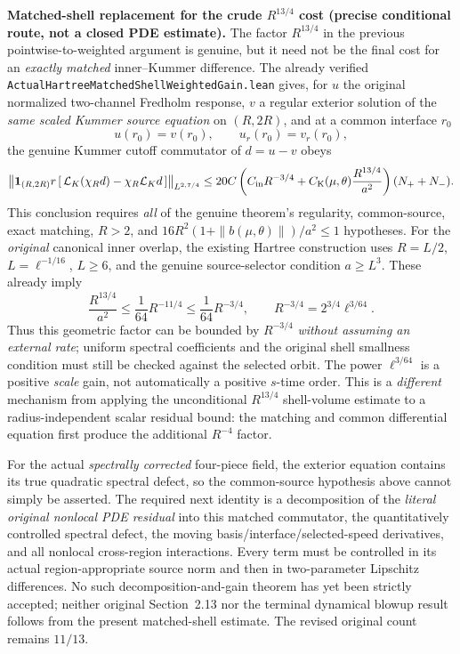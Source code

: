 \documentclass[11pt]{amsart}
\begin{document}
\medskip
\noindent\textbf{Matched-shell replacement for the crude $R^{13/4}$ cost
(precise conditional route, not a closed PDE estimate).}
The factor $R^{13/4}$ in the previous pointwise-to-weighted
argument is genuine, but it need not be the final cost for an
\emph{exactly matched} inner--Kummer difference.
The already verified
\texttt{ActualHartreeMatchedShellWeightedGain.lean} gives, for
$u$ the original normalized two-channel Fredholm response,
$v$ a regular exterior solution of the \emph{same scaled Kummer
source equation} on $(R,2R)$, and at a common interface $r_0$
\[
 u(r_0)=v(r_0),\qquad u_r(r_0)=v_r(r_0),
\]
the genuine Kummer cutoff commutator of $d=u-v$ obeys
\[
 \bigl\|\mathbf1_{(R,2R)}r\,
 [\,\mathcal L_K(\chi_Rd)-\chi_R\mathcal L_Kd\,]\bigr\|_{L^{2,7/4}}
 \le
 20C\left(C_{\rm in}R^{-3/4}
   +C_{\rm K}(\mu,\theta)\frac{R^{13/4}}{a^2}\right)
 (N_++N_-).
\]
This conclusion requires \emph{all} of the genuine theorem's
regularity, common-source, exact matching, $R>2$, and
$16R^2(1+\|b(\mu,\theta)\|)/a^2\le1$ hypotheses.
For the \emph{original} canonical inner overlap,
the existing Hartree construction uses
$R=L/2$, $L=\ell^{-1/16}$, $L\ge6$, and the genuine
source-selector condition $a\ge L^3$.
These already imply
\[
 \frac{R^{13/4}}{a^2}
 \le \frac1{64}R^{-11/4}
 \le \frac1{64}R^{-3/4},\qquad
 R^{-3/4}=2^{3/4}\ell^{3/64}.
\]
Thus this geometric factor can be bounded by
$R^{-3/4}$ \emph{without assuming an external rate};
uniform spectral coefficients and the original shell
smallness condition must still be checked against the selected orbit.
The power $\ell^{3/64}$ is a positive \emph{scale} gain,
not automatically a positive $s$-time order.
This is a \emph{different} mechanism from applying
the unconditional $R^{13/4}$ shell-volume estimate
to a radius-independent scalar residual bound:
the matching and common differential equation first
produce the additional $R^{-4}$ factor.

For the actual \emph{spectrally corrected} four-piece field,
the exterior equation contains its true quadratic spectral defect,
so the common-source hypothesis above cannot simply be asserted.
The required next identity is a decomposition of the \emph{literal
original nonlocal PDE residual} into this matched commutator,
the quantitatively controlled spectral defect, the moving
basis/interface/selected-speed derivatives, and all nonlocal
cross-region interactions. Every term must be controlled in its
actual region-appropriate source norm and then in two-parameter
Lipschitz differences. No such decomposition-and-gain theorem
has yet been strictly accepted; neither original Section~2.13 nor
the terminal dynamical blowup result follows from the present
matched-shell estimate. The revised original count remains $11/13$.
\end{document}

